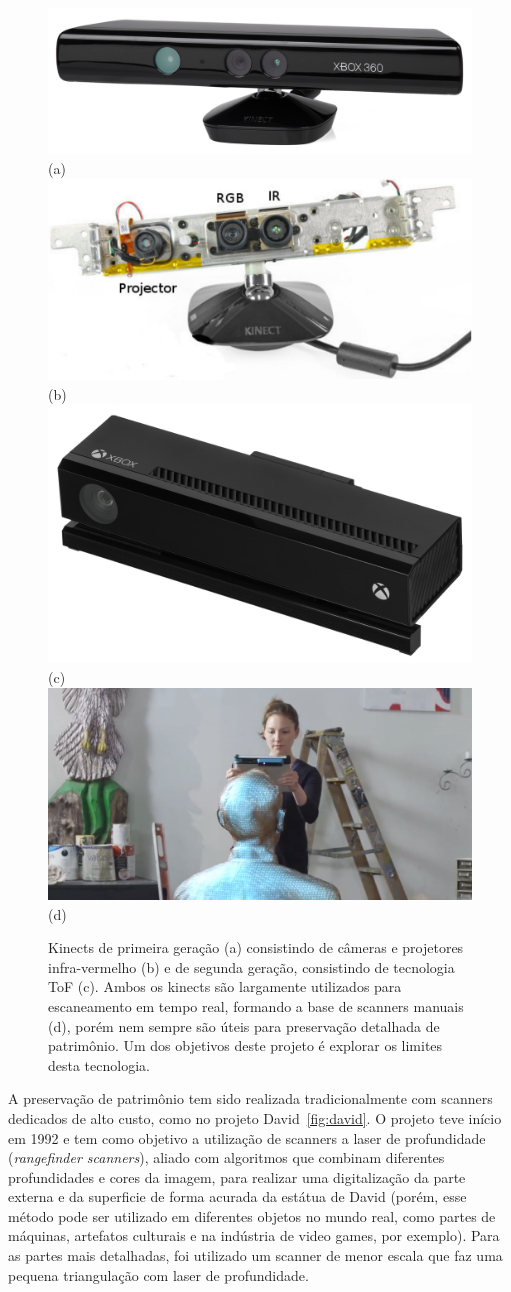 \begin{figure} [!h]
	\centering
	\includegraphics[width=0.45\linewidth]{figs/Xbox-360-Kinect-Standalone.png}(a)
	\includegraphics[width=0.45\linewidth]{figs/kinect-internals.pdf}(b)
 	\includegraphics[width=0.45\linewidth]{figs/Xbox-One-Kinect.jpg}(c)
 	\includegraphics[width=0.45\linewidth]{figs/kinect-handheld1.png} (d)
	\caption{%
   Kinects de primeira geração (a) consistindo de câmeras e projetores
   infra-vermelho (b) e de segunda geração, consistindo de tecnologia ToF (c). 
   Ambos os kinects são largamente utilizados para escaneamento em tempo real, 
   formando a base de scanners manuais (d), porém nem sempre são úteis para 
   preservação detalhada de patrimônio. Um dos objetivos deste
   projeto é explorar os limites desta tecnologia.
	}\label{fig:kinect}
\end{figure}

A preservação de patrimônio tem sido realizada tradicionalmente com scanners
dedicados de alto custo, como no projeto David~\ref{fig:david}.
O projeto teve início em 1992 e tem como objetivo a utilização de scanners a laser de profundidade
(\emph{rangefinder scanners}), aliado com algoritmos que combinam diferentes profundidades e cores da imagem, 
para realizar uma digitalização da parte externa e da superficie de forma acurada da estátua de David 
(porém, esse método pode ser utilizado em diferentes objetos no mundo real, 
como partes de máquinas, artefatos culturais e na indústria de video games, por exemplo). 
Para as partes mais detalhadas, foi utilizado um scanner de menor escala que faz uma pequena 
triangulação com laser de profundidade.

